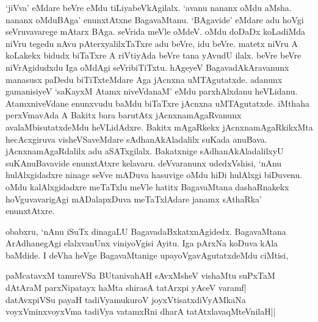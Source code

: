 `jiVva' eMdare beVre eMdu tiLiyabeVkAgilalx. `avanu nananx oMdu aMsha. nananx oMduBAga' enunxtAtxne BagavaMtanu. `BAgavide' eMdare adu hoVgi seVruvavarege mAtarx BAga. seVrida meVle oMdeV. oMdu doDaDx koLadiMda niVru tegedu nAvu pAterxyalilxTaTxre adu beVre, idu beVre. matetx niVru A koLakekx bidudx biTaTxre A riVtiyAda beVre tana yAvudU ilalx. beVre beVre niVrAgidudxdu Iga oMdAgi seVribiTiTxtu. hAgeyeV BagavadAkAravanunx manasusx paDedu biTiTxteMdare Aga jAcnxna uMTAgutatxde. adanunx gamanisiyeV `saKayxM Atamx niveVdanaM' eMdu parxhAlxdanu heVLidanu. AtamxniveVdane enunxvudu baMdu biTaTxre jAcnxna uMTAgutatxde. iMthaha perxVmavAda A Bakitx bara barutAtx jAcnxnamAgaRvanunx avalaMbisutatxdeMdu heVLidAdxre. Bakitx mAgaRkekx jAcnxnamAgaRkikxMta hecAcxgiruva visheVSaveMdare sAdhanAkAladalilx suKada anuBava. jAcnxnamAgaRdalilx adu aSATxgilalx. Bakatxnige sAdhanAkAladalilxyU suKAnuBavavide enunxtAtxre kelavaru. deVvaranunx udedxVshisi, `nAnu hulAlxgidadxre ninage seVve mADuva hasuvige oMdu hiDi hulAlxgi biDuvenu. oMdu kalAlxgidadxre meTaTxlu meVle hatitx BagavaMtana dashaRnakekx hoVguvavarigAgi mADalapxDuva meTaTxlAdare janamx sAthaRka' enunxtAtxre.

obabxru, `nAnu iSuTx dinagaLU BagavadaBxkatxnAgidedx. BagavaMtana ArAdhanegAgi elalxvanUnx viniyoVgisi Ayitu. Iga pArxNa koDuva kAla baMdide. I deVha heVge BagavaMtanige upayoVgavAgutatxdeMdu ciMtisi,

\begin{shloka}
paMcatavxM tanureVSa BUtanivahAH sAvxMsheV vishaMtu suPxTaM\\
dAtAraM parxNipatayx haMta shirasA tatArxpi yAceV varamf|\\
datAvxpiVSu payaH tadiVyamukuroV joyxVtisatxdiVyAMkaNa\\
voyxVminxvoyxVma tadiVya vatamxRni dharA tatAtxlavaqMteV\s nilaH||
\end{shloka}

